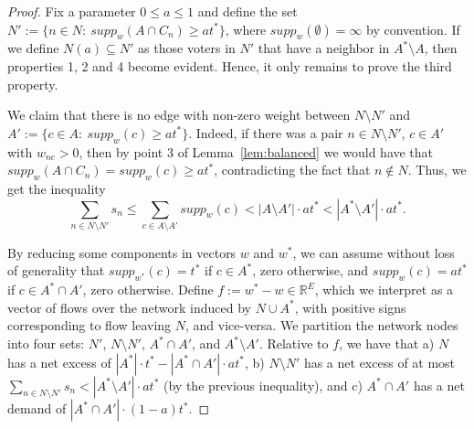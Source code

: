 \begin{proof}
Fix a parameter $0\leq a\leq 1$ and define the set $N':=\{n\in N: \ supp_w(A\cap C_n)\geq at^*\}$, where $supp_w(\emptyset)=\infty$ by convention. If we define $N(a)\subseteq N'$ as those voters in $N'$ that have a neighbor in $A^*\setminus A$, then properties 1, 2 and 4 become evident. Hence, it only remains to prove the third property.

We claim that there is no edge with non-zero weight between $N\setminus N'$ and $A':=\{c\in A: \ supp_w(c)\geq at^*\}$. 
Indeed, if there was a pair $n\in N\setminus N'$, $c\in A'$ with $w_{nc}>0$, then by point 3 of Lemma~\ref{lem:balanced} we would have that $supp_w(A\cap C_n)=supp_w(c)\geq at^*$, contradicting the fact that $n\not\in N$. 
Thus, we get the inequality
$$\sum_{n\in N\setminus N'} s_n \leq \sum_{c\in A\setminus A'} supp_w(c) < |A\setminus A'|\cdot at^*< |A^*\setminus A'|\cdot at^*.$$

By reducing some components in vectors $w$ and $w^*$, we can assume without loss of generality that $supp_{w^*}(c)=t^*$ if $c\in A^*$, zero otherwise, and $supp_{w}(c)=a t^*$ if $c\in A^*\cap A'$, zero otherwise. Define $f:=w^* - w\in\mathbb{R}^E$, which we interpret as a vector of flows over the network induced by $N\cup A^*$, with positive signs corresponding to flow leaving $N$, and vice-versa. We partition the network nodes into four sets: $N'$, $N\setminus N'$, $A^*\cap A'$, and $A^*\setminus A'$. Relative to $f$, we have that a) $N$ has a net excess of $|A^*|\cdot t^* - |A^*\cap A'|\cdot a t^*$, b) $N\setminus N'$ has a net excess of at most $\sum_{n\in N\setminus N'} s_n < |A^*\setminus A'|\cdot at^*$ (by the previous inequality), and c) $A^*\cap A'$ has a net demand of $|A^*\cap A'|\cdot (1-a) t^*$. 


\end{proof}
